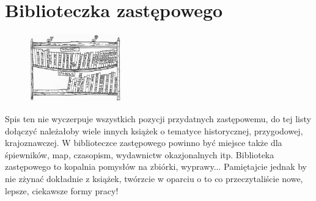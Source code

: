 \chapter{Biblioteczka zastępowego}
\begin{figure}
  \begin{center}
    \includegraphics[width=4cm]{grafiki/biblioteczka.png}
  \end{center}
\end{figure} Spis ten nie wyczerpuje wszystkich pozycji przydatnych zastępowemu, do tej listy dołączyć należałoby wiele innych książek o tematyce historycznej, przygodowej, krajoznawczej. W biblioteczce zastępowego powinno być miejsce także dla śpiewników, map, czasopism, wydawnictw okazjonalnych itp. Biblioteka zastępowego to kopalnia pomysłów na zbiórki, wyprawy... Pamiętajcie jednak by nie zżynać dokładnie z książek, twórzcie w oparciu o to co przeczytaliście nowe, lepsze, ciekawsze formy pracy!
